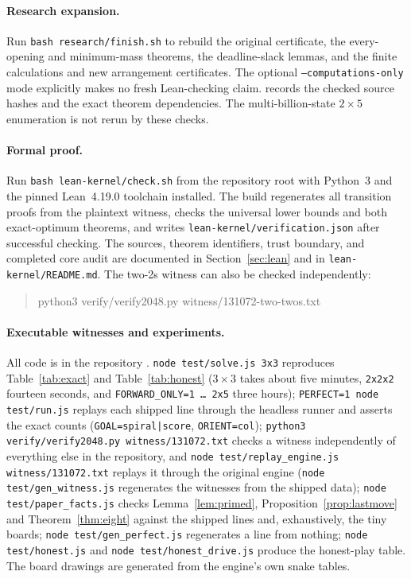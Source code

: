 \documentclass[11pt]{article}
\theoremstyle{definition}
\theoremstyle{remark}
\begin{document}
\paragraph{Research expansion.}
Run \texttt{bash research/finish.sh} to rebuild the original certificate,
the every-opening and minimum-mass theorems, the deadline-slack lemmas,
and the finite calculations and new arrangement certificates.
The optional \texttt{--computations-only} mode explicitly makes no fresh
Lean-checking claim. 
records the checked source hashes and the exact theorem dependencies.
The multi-billion-state $2\times5$ enumeration is not rerun by these checks.

\paragraph{Formal proof.}
Run \texttt{bash lean-kernel/check.sh} from the repository root with
Python~3 and the pinned Lean~4.19.0 toolchain installed. The build
regenerates all transition proofs from the plaintext witness, checks the
universal lower bounds and both exact-optimum theorems, and writes
\texttt{lean-kernel/verification.json} after successful checking.
The sources, theorem identifiers, trust boundary, and completed core
audit are documented in Section~\ref{sec:lean} and in
\texttt{lean-kernel/README.md}. The two-2s witness can also be checked independently:
\begin{quote}\small\ttfamily
python3 verify/verify2048.py witness/131072-two-twos.txt
\end{quote}

\paragraph{Executable witnesses and experiments.}
\sloppy
All code is in the repository \cite{superintelligence2026}. \texttt{node
test/solve.js 3x3} reproduces Table~\ref{tab:exact} and
Table~\ref{tab:honest} ($3\times3$ takes about five minutes,
\texttt{2x2x2} fourteen seconds, and \texttt{FORWARD\_ONLY=1 \dots\ 2x5}
three hours);
\texttt{PERFECT=1 node test/run.js} replays each shipped line through the
headless runner and asserts the exact counts (\texttt{GOAL=spiral|score},
\texttt{ORIENT=col}); \texttt{python3 verify/verify2048.py witness/131072.txt} checks a
witness independently of everything else in the repository, and
\texttt{node test/replay\_engine.js witness/131072.txt} replays it
through the original engine (\texttt{node test/gen\_witness.js}
regenerates the witnesses from the shipped data); \texttt{node test/paper\_facts.js} checks
Lemma~\ref{lem:primed}, Proposition~\ref{prop:lastmove} and
Theorem~\ref{thm:eight} against the shipped lines and, exhaustively, the
tiny boards; \texttt{node test/gen\_perfect.js} regenerates a line from
nothing; \texttt{node test/honest.js} and \texttt{node
test/honest\_drive.js} produce the honest-play table. The board drawings
are generated from the engine's own snake tables.
\end{document}
